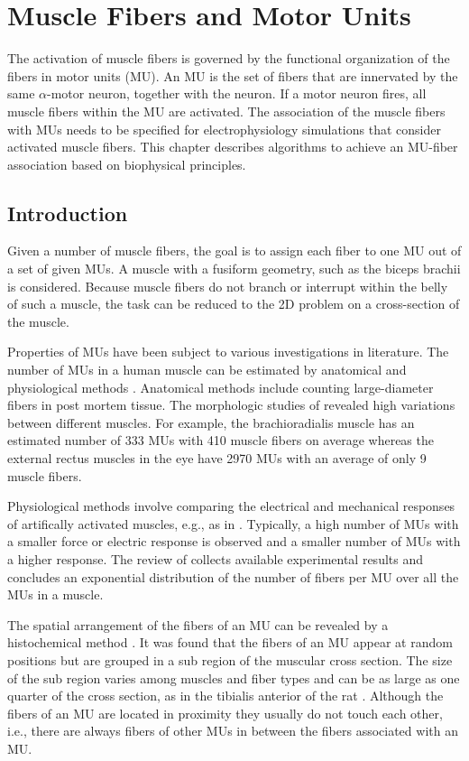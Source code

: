 
\chapter{Muscle Fibers and Motor Units} 
The activation of muscle fibers is governed by the functional organization of the fibers in motor units (MU). An MU is the set of fibers that are innervated by the same $\alpha$-motor neuron, together with the neuron. If a motor neuron fires, all muscle fibers within the MU are activated. The association of the muscle fibers with MUs needs to be specified for electrophysiology simulations that consider activated muscle fibers. This chapter describes algorithms to achieve an MU-fiber association based on biophysical principles.

\section{Introduction}\label{sec:mu_intro}
Given a number of muscle fibers, the goal is to assign each fiber to one MU out of a set of given MUs. A muscle with a fusiform geometry, such as the biceps brachii is considered. Because muscle fibers do not branch or interrupt within the belly of such a muscle, the task can be reduced to the 2D problem on a cross-section of the muscle.

Properties of MUs have been subject to various investigations in literature. The number of MUs in a human muscle can be estimated by anatomical and physiological methods \cite{MacIntosh2006}. Anatomical methods include counting large-diameter fibers in post mortem tissue. The morphologic studies of \cite{Feinstein1955} revealed high variations between different muscles. For example, the brachioradialis muscle has an estimated number of \num{333} MUs with \num{410} muscle fibers on average whereas the external rectus muscles in the eye have \num{2970} MUs with an average of only 9 muscle fibers. 

Physiological methods involve comparing the electrical and mechanical responses of artifically activated muscles, e.g., as in \cite{Milner-Brown1973b,Thomas1990b}. Typically, a high number of MUs with a smaller force or electric response is observed and a smaller number of MUs with a higher response. 
The review of \cite{Enoka2001} collects available experimental results and concludes an exponential distribution of the number of fibers per MU over all the MUs in a muscle.

The spatial arrangement of the fibers of an MU can be revealed by a histochemical method \cite{brandstater1969histochemical}. It was found that the fibers of an MU appear at random positions but are grouped in a sub region of the muscular cross section. The size of the sub region varies among muscles and fiber types and can be as large as one quarter of the cross section, as in the tibialis anterior of the rat \cite{Edstrom1968}. Although the fibers of an MU are located in proximity they usually do not touch each other, i.e., there are always fibers of other MUs in between the fibers associated with an MU.

